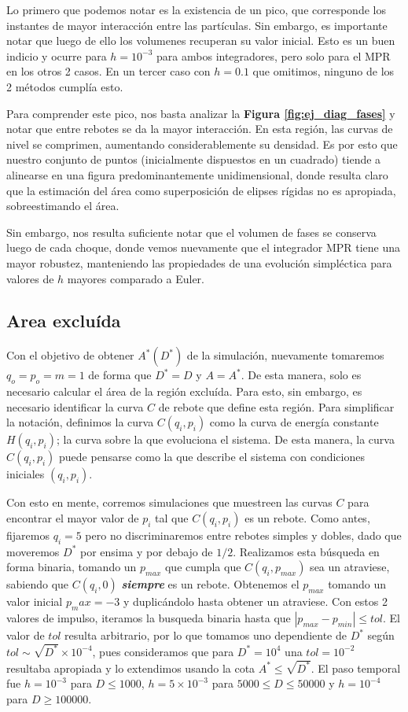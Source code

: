 Lo primero que podemos notar es la existencia de un pico, que corresponde los instantes de mayor interacción entre las partículas.
Sin embargo, es importante notar que luego de ello los volumenes recuperan su valor inicial.
Esto es un buen indicio y ocurre para $h=10^{-3}$ para ambos integradores, pero solo para el MPR en los otros 2 casos.
En un tercer caso con $h=0.1$ que omitimos, ninguno de los 2 métodos cumplía esto.

Para comprender este pico, nos basta analizar la \textbf{Figura \ref{fig:ej_diag_fases}} y notar que entre rebotes se da la mayor interacción.
En esta región, las curvas de nivel se comprimen, aumentando considerablemente su densidad.
Es por esto que nuestro conjunto de puntos (inicialmente dispuestos en un cuadrado) tiende a alinearse en una figura predominantemente unidimensional, donde resulta claro que la estimación del área
como superposición de elipses rígidas no es apropiada, sobreestimando el área.

Sin embargo, nos resulta suficiente notar que el volumen de fases se conserva luego de cada choque, donde vemos nuevamente que el integrador MPR tiene una mayor robustez,
manteniendo las propiedades de una evolución simpléctica para valores de $h$ mayores comparado a Euler.


\subsection{Area excluída}{\label{sec:area_ex_comp}}

Con el objetivo de obtener $A^*(D^*)$ de la simulación, nuevamente tomaremos $q_o = p_o = m = 1$ de forma que $D^* = D$ y $A=A^*$.
De esta manera, solo es necesario calcular el área de la región excluída.
Para esto, sin embargo, es necesario identificar la curva $C$ de rebote que define esta región.
Para simplificar la notación, definimos la curva $C(q_i,p_i)$ como la curva de energía constante $H(q_i,p_i)$; la curva sobre la que evoluciona el sistema.
De esta manera, la curva $C(q_i,p_i)$ puede pensarse como la que describe el sistema con condiciones iniciales $(q_i,p_i)$.

Con esto en mente, corremos simulaciones que muestreen las curvas $C$ para encontrar el mayor valor de $p_i$ tal que $C(q_i, p_i)$ es un rebote.
Como antes, fijaremos $q_i=5$ pero no discriminaremos entre rebotes simples y dobles, dado que moveremos $D^*$ por ensima y por debajo de $1/2$.
Realizamos esta búsqueda en forma binaria, tomando un $p_{max}$ que cumpla que $C(q_i, p_{max})$ sea un atraviese, sabiendo que $C(q_i, 0)$ \textbf{\textit{siempre}} es un rebote.
Obtenemos el $p_{max}$ tomando un valor inicial $p_max = -3$ y duplicándolo hasta obtener un atraviese.
Con estos 2 valores de impulso, iteramos la busqueda binaria hasta que $|p_{max}-p_{min}|\leq tol$.
El valor de $tol$ resulta arbitrario, por lo que tomamos uno dependiente de $D^*$ según $tol \sim \sqrt{D^*}\times 10^{-4}$, pues consideramos que para $D^*=10^4$
una $tol = 10^{-2}$ resultaba apropiada y lo extendimos usando la cota $A^*\leq \sqrt{D^*}$.
El paso temporal fue $h=10^{-3}$ para $D\leq 1000$, $h=5\times10^{-3}$ para $5000\leq D\leq 50000$ y $h=10^{-4}$ para $D\geq 100000$.

